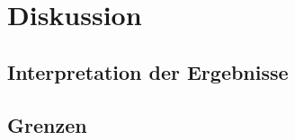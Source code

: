 \chapter{Diskussion}\label{ch:diskussion}


\section{Interpretation der Ergebnisse}


\section{Grenzen}
